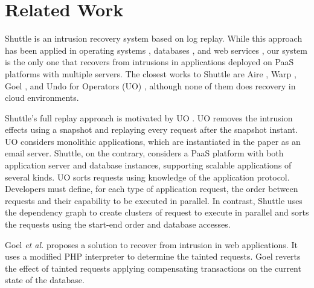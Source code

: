 
\section{Related Work}
\label{sec:related_work}

Shuttle is an intrusion recovery system based on log replay. While this approach has been applied in operating systems \cite{taser,retro,dare}, databases \cite{itdb,phoenix}, and web services \cite{warp,goel,aire}, our system is the only one that recovers from intrusions in applications deployed on \ac{PaaS} platforms with multiple servers. The closest works to Shuttle are Aire \cite{aire}, Warp \cite{warp}, Goel \cite{goel}, and Undo for Operators (UO) \cite{undoForOperators}, although none of them does recovery in cloud environments.

Shuttle's full replay approach is motivated by UO \cite{undoForOperators}. UO removes the intrusion effects using a snapshot and replaying every request after the snapshot instant. UO considers monolithic applications, which are instantiated in the paper as an email server. Shuttle, on the contrary, considers a \ac{PaaS} platform with both application server and database instances, supporting scalable applications of several kinds. UO sorts requests using knowledge of the application protocol. Developers must define, for each type of application request, the order between requests and their capability to be executed in parallel. In contrast, Shuttle uses the dependency graph to create clusters of request to execute in parallel and sorts the requests using the start-end order and database accesses.


Goel \emph{et al.} \cite{goel} proposes a solution to recover from intrusion in web applications. It uses a modified PHP interpreter to determine the tainted requests. Goel reverts the effect of tainted requests applying compensating transactions on the current state of the database. %

